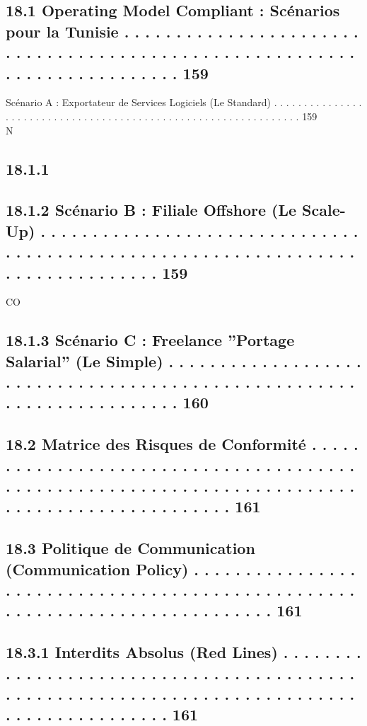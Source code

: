 \subsection{18.1    Operating Model Compliant : Scénarios pour la Tunisie . . . . . . . . . . . . . . . . . . . . . . . . . . . . . . . . . . . . . . . . . . . . . . . . . . . . . . . . . . . . . . . . . . . . . . . . . . 159}
Scénario A : Exportateur de Services Logiciels (Le Standard) . . . . . . . . . . . . . . . . . . . . . . . . . . . . . . . . . . . . . . . . . . . . . . . . . . . . . . . . . . . . . . . . 159\\
\vspace{0.5em}
N\\
\subsection{18.1.1}
\subsection{18.1.2            Scénario B : Filiale Offshore (Le Scale-Up) . . . . . . . . . . . . . . . . . . . . . . . . . . . . . . . . . . . . . . . . . . . . . . . . . . . . . . . . . . . . . . . . . . . . . . . . . . . . . . . . 159}
CO\\
\subsection{18.1.3            Scénario C : Freelance ”Portage Salarial” (Le Simple) . . . . . . . . . . . . . . . . . . . . . . . . . . . . . . . . . . . . . . . . . . . . . . . . . . . . . . . . . . . . . . . . . . . . . . 160}
\subsection{18.2    Matrice des Risques de Conformité . . . . . . . . . . . . . . . . . . . . . . . . . . . . . . . . . . . . . . . . . . . . . . . . . . . . . . . . . . . . . . . . . . . . . . . . . . . . . . . . . . . . . . . . . . . . . . . 161}
\subsection{18.3    Politique de Communication (Communication Policy) . . . . . . . . . . . . . . . . . . . . . . . . . . . . . . . . . . . . . . . . . . . . . . . . . . . . . . . . . . . . . . . . . . . . . . . . . . . . 161}
\subsection{18.3.1            Interdits Absolus (Red Lines) . . . . . . . . . . . . . . . . . . . . . . . . . . . . . . . . . . . . . . . . . . . . . . . . . . . . . . . . . . . . . . . . . . . . . . . . . . . . . . . . . . . . . . . . . . . . 161}
